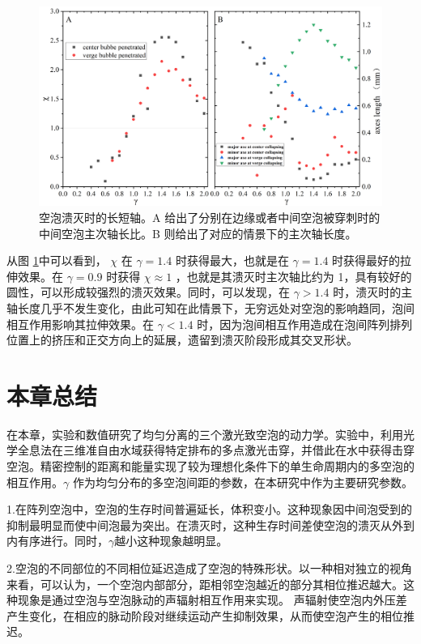 \begin{figure}[H]
    \centering
    \includegraphics[width=1\linewidth]{img/fig4.20.png}
    \caption[空泡溃灭时的长短轴。]{空泡溃灭时的长短轴。A
给出了分别在边缘或者中间空泡被穿刺时的中间空泡主次轴长比。B
则给出了对应的情景下的主次轴长度。}
    \label{fig:4.20}
\end{figure}


从图 \ref{fig:4.20}中可以看到， $\chi$ 在 $\gamma=1.4$ 时获得最大，也就是在
$\gamma=1.4$ 时获得最好的拉伸效果。在 $\gamma=0.9$ 时获得
$\chi\approx 1$ ，也就是其溃灭时主次轴比约为
1，具有较好的圆性，可以形成较强烈的溃灭效果。同时，可以发现，在
$\gamma>1.4$
时，溃灭时的主轴长度几乎不发生变化，由此可知在此情景下，无穷远处对空泡的影响趋同，泡间相互作用影响其拉伸效果。在
$\gamma<1.4$
时，因为泡间相互作用造成在泡间阵列排列位置上的挤压和正交方向上的延展，遗留到溃灭阶段形成其交叉形状。

\section{本章总结}

在本章，实验和数值研究了均匀分离的三个激光致空泡的动力学。实验中，利用光学全息法在三维准自由水域获得特定排布的多点激光击穿，并借此在水中获得击穿空泡。精密控制的距离和能量实现了较为理想化条件下的单生命周期内的多空泡的相互作用。$\gamma$
作为均匀分布的多空泡间距的参数，在本研究中作为主要研究参数。

1.在阵列空泡中，空泡的生存时间普遍延长，体积变小。这种现象因中间泡受到的抑制最明显而使中间泡最为突出。在溃灭时，这种生存时间差使空泡的溃灭从外到内有序进行。同时，$\gamma$越小这种现象越明显。

2.空泡的不同部位的不同相位延迟造成了空泡的特殊形状。以一种相对独立的视角来看，可以认为，一个空泡内部部分，距相邻空泡越近的部分其相位推迟越大。这种现象是通过空泡与空泡脉动的声辐射相互作用来实现。
声辐射使空泡内外压差产生变化，在相应的脉动阶段对继续运动产生抑制效果，从而使空泡产生的相位推迟。

